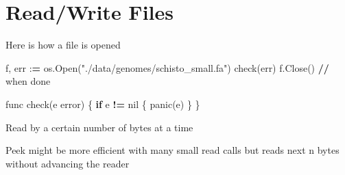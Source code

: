 \documentclass[]{book}
\newenvironment{Shaded}{\begin{snugshade}}{\end{snugshade}}
\newcommand{\DecValTok}[1]{\textcolor[rgb]{0.00,0.00,0.81}{#1}}
\newcommand{\CharTok}[1]{\textcolor[rgb]{0.31,0.60,0.02}{#1}}
\newcommand{\SpecialCharTok}[1]{\textcolor[rgb]{0.00,0.00,0.00}{#1}}
\newcommand{\StringTok}[1]{\textcolor[rgb]{0.31,0.60,0.02}{#1}}
\newcommand{\ControlFlowTok}[1]{\textcolor[rgb]{0.13,0.29,0.53}{\textbf{#1}}}
\newcommand{\OperatorTok}[1]{\textcolor[rgb]{0.81,0.36,0.00}{\textbf{#1}}}
\newcommand{\NormalTok}[1]{#1}
\begin{document}
\section{Read/Write Files}\label{readwrite-files}

Here is how a file is opened

\begin{Shaded}
\begin{Highlighting}[]
\NormalTok{f, err :}\OperatorTok{=}\NormalTok{ os.Open(}\StringTok{"./data/genomes/schisto_small.fa"}\NormalTok{)}
\NormalTok{check(err)}
\NormalTok{f.Close() }\OperatorTok{//}\NormalTok{ when done}

\NormalTok{func check(e error) \{}
    \ControlFlowTok{if}\NormalTok{ e }\OperatorTok{!=}\NormalTok{ nil \{    }
\NormalTok{        panic(e)     }
\NormalTok{    \}                }
\NormalTok{\}}
\end{Highlighting}
\end{Shaded}

Read by a certain number of bytes at a time

\begin{Shaded}
\end{Shaded}

Peek might be more efficient with many small read calls but reads next n
bytes without advancing the reader

\begin{Shaded}
\end{Shaded}
\end{document}
